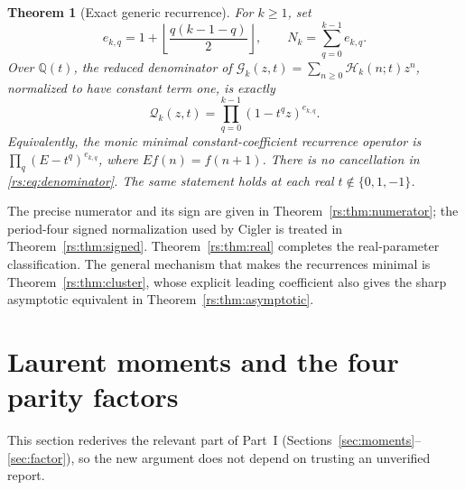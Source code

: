 \documentclass[11pt]{article}
\newtheorem{theorem}{Theorem}[section]
\theoremstyle{definition}
\theoremstyle{remark}
\newcommand{\Q}{\mathbb Q}
\newcommand{\Ht}{\mathcal H}
\newcommand{\QQ}{\mathscr Q}
\newcommand{\GG}{\mathscr G}
\theoremstyle{definition}
\theoremstyle{plain}
\numberwithin{equation}{section}
\begin{document}
\begin{theorem}[Exact generic recurrence]
\label{rs:thm:recurrence-main}
For $k\ge1$, set
\begin{equation}
 e_{k,q}=1+\left\lfloor\frac{q(k-1-q)}2\right\rfloor,
 \qquad N_k=\sum_{q=0}^{k-1}e_{k,q}.
 \label{rs:eq:exponents}
\end{equation}
Over $\Q(t)$, the reduced denominator of
$\GG_k(z,t)=\sum_{n\ge0}\Ht_k(n;t)z^n$, normalized to have constant term one,
is exactly
\begin{equation}
 \boxed{\QQ_k(z,t)=\prod_{q=0}^{k-1}(1-t^qz)^{e_{k,q}}.}
 \label{rs:eq:denominator}
\end{equation}
Equivalently, the monic minimal constant-coefficient recurrence operator is
$\prod_q(E-t^q)^{e_{k,q}}$, where $Ef(n)=f(n+1)$.
There is no cancellation in \eqref{rs:eq:denominator}. The same statement holds
at each real $t\notin\{0,1,-1\}$.
\end{theorem}

The precise numerator and its sign are given in
Theorem~\ref{rs:thm:numerator}; the period-four signed normalization used by
Cigler is treated in Theorem~\ref{rs:thm:signed}. Theorem~\ref{rs:thm:real} completes
the real-parameter classification. The general mechanism that makes the
recurrences minimal is Theorem~\ref{rs:thm:cluster}, whose explicit leading
coefficient also gives the sharp asymptotic equivalent in
Theorem~\ref{rs:thm:asymptotic}.

\section{Laurent moments and the four parity factors}
\label{rs:sec:parity}
This section rederives the relevant part of Part~I (Sections~\ref{sec:moments}--\ref{sec:factor}), so the new
argument does not depend on trusting an unverified report.
\end{document}
